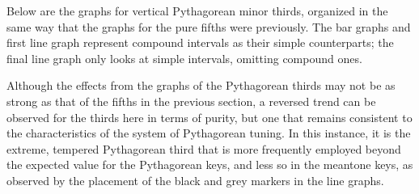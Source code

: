 Below are the graphs for vertical Pythagorean minor thirds, organized in
the same way that the graphs for the pure fifths were previously. The
bar graphs and first line graph represent compound intervals as their
simple counterparts; the final line graph only looks at simple
intervals, omitting compound ones.


    \begin{center}
    \end{center}
    


    \begin{center}
    \end{center}
    


    \begin{center}
    \end{center}
    
    Although the effects from the graphs of the Pythagorean thirds may not
be as strong as that of the fifths in the previous section, a reversed
trend can be observed for the thirds here in terms of purity, but one
that remains consistent to the characteristics of the system of
Pythagorean tuning. In this instance, it is the extreme, tempered
Pythagorean third that is more frequently employed beyond the expected
value for the Pythagorean keys, and less so in the meantone keys, as
observed by the placement of the black and grey markers in the line
graphs.

